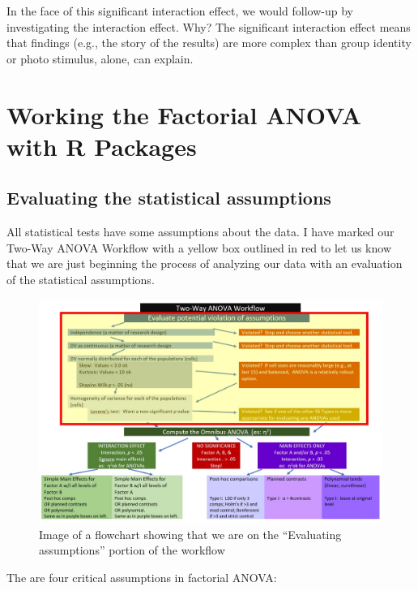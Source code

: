 \documentclass[
  11pt,
]{book}
\begin{document}
In the face of this significant interaction effect, we would follow-up by investigating the interaction effect. Why? The significant interaction effect means that findings (e.g., the story of the results) are more complex than group identity or photo stimulus, alone, can explain.

\hypertarget{working-the-factorial-anova-with-r-packages}{%
\section{Working the Factorial ANOVA with R Packages}\label{working-the-factorial-anova-with-r-packages}}

\hypertarget{evaluating-the-statistical-assumptions-4}{%
\subsection{Evaluating the statistical assumptions}\label{evaluating-the-statistical-assumptions-4}}

All statistical tests have some assumptions about the data. I have marked our Two-Way ANOVA Workflow with a yellow box outlined in red to let us know that we are just beginning the process of analyzing our data with an evaluation of the statistical assumptions.

\begin{figure}
\centering
\includegraphics{images/factorial/WrkFlw_Assumptions.jpg}
\caption{Image of a flowchart showing that we are on the ``Evaluating assumptions'' portion of the workflow}
\end{figure}

The are four critical assumptions in factorial ANOVA:
\end{document}
